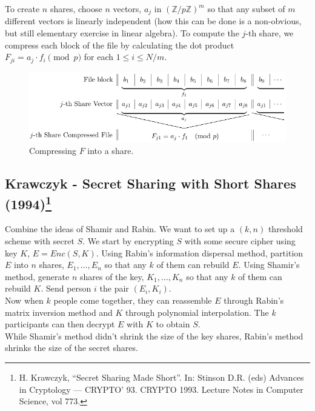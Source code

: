 \documentclass[12pt]{article}
\newcommand{\integers}{\mathbb{Z}}
\begin{document}
\noindent To create $n$ shares, choose $n$ vectors, $a_j$ in $(\integers/p\integers)^m$ so that any subset of $m$ different vectors is linearly independent (how this can be done is a non-obvious, but still elementary exercise in linear algebra). To compute the $j$-th share, we compress each block of the file by calculating the dot product $F_{ji} = a_j\cdot f_i\pmod{p}$ for each $1\leq i\leq N/m$.

\begin{figure}[h]
 	\centering
 		\includegraphics[scale=.7]{rabin_compression.png}
 	\caption{Compressing $F$ into a share.}
\end{figure} 

\subsection*{Krawczyk - Secret Sharing with Short Shares (1994)\footnote{H. Krawczyk, ``Secret Sharing Made Short''. In: Stinson D.R. (eds) Advances in Cryptology — CRYPTO’ 93. CRYPTO 1993. Lecture Notes in Computer Science, vol 773.}}
Combine the ideas of Shamir and Rabin. We want to set up a $(k,n)$ threshold scheme with secret $S$. We start by encrypting $S$ with some secure cipher using key $K$, $E = Enc(S, K)$. Using Rabin's information dispersal method, partition $E$ into $n$ shares, $E_1, \ldots, E_n$ so that any $k$ of them can rebuild $E$. Using Shamir's method, generate $n$ shares of the key, $K_1, \ldots, K_n$ so that any $k$ of them can rebuild $K$. Send person $i$ the pair $(E_i, K_i)$.\\

\noindent Now when $k$ people come together, they can reassemble $E$ through Rabin's matrix inversion method and $K$ through polynomial interpolation. The $k$ participants can then decrypt $E$ with $K$ to obtain $S$.\\

\noindent While Shamir's method didn't shrink the size of the key shares, Rabin's method shrinks the size of the secret shares.



\end{document}
